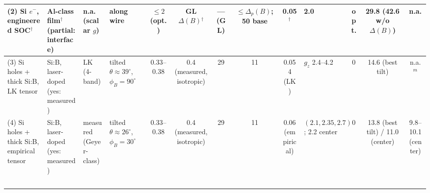 \begin{table}[tb]
{\begin{tabular}{l l l l c c c c c l c c c}
(2) Si $e^-$, engineered SOC$^{\dagger}$ &
Al-class film$^{\dagger}$ (partial: interface) & n.a.\ (scalar $g$) &
along wire & $\le 2$ (opt.) & GL $\Delta(B)$$^{\dagger}$ & --- (GL) &
$\le \Delta_p(B)$; 50 base & 0.05$^{\dagger}$ & 2.0 & opt. &
29.8 (42.6 w/o $\Delta(B)$) & n.a.\\
\midrule
(3) Si holes + thick Si:B, LK tensor &
Si:B, laser-doped (yes: measured) & LK (4-band) &
tilted $\theta\!\approx\!39^\circ$, $\phi_B\!=\!90^\circ$ & 0.33--0.38 &
0.4 (measured, isotropic) & 29 & 11 & 0.054 (LK) & $g_z$ 2.4--4.2 & 0 &
14.6 (best tilt) & n.a.$^{m}$\\
(4) Si holes + thick Si:B, empirical tensor &
Si:B, laser-doped (yes: measured) & measured (Geyer-class) &
tilted $\theta\!\approx\!26^\circ$, $\phi_B\!=\!30^\circ$ & 0.33--0.38 &
0.4 (measured, isotropic) & 29 & 11 & 0.06 (empirical) &
$(2.1, 2.35, 2.7)$; 2.2 center & 0 & 13.8 (best tilt) / 11.0 (center) &
9.8--10.1 (center)\\
$$
\end{tabular}}
\end{table}
